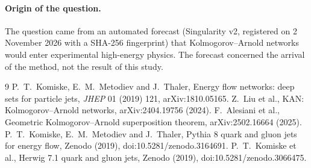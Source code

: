 \documentclass[11pt]{article}
\begin{document}
\paragraph{Origin of the question.} The question came from an automated forecast (Singularity v2, registered on 2
November 2026 with a SHA-256 fingerprint) that Kolmogorov--Arnold networks would enter experimental high-energy
physics. The forecast concerned the arrival of the method, not the result of this study.

\begin{thebibliography}{9}
 P.~T.~Komiske, E.~M.~Metodiev and J.~Thaler, Energy flow networks: deep sets for particle jets,
\emph{JHEP} 01 (2019) 121, arXiv:1810.05165.
 Z.~Liu et al., KAN: Kolmogorov--Arnold networks, arXiv:2404.19756 (2024).
 F.~Alesiani et al., Geometric Kolmogorov--Arnold superposition theorem, arXiv:2502.16664 (2025).
 P.~T.~Komiske, E.~M.~Metodiev and J.~Thaler, Pythia 8 quark and gluon jets for energy flow,
Zenodo (2019), doi:10.5281/zenodo.3164691.
 P.~T.~Komiske et al., Herwig 7.1 quark and gluon jets, Zenodo (2019),
doi:10.5281/zenodo.3066475.
\end{thebibliography}
\end{document}
